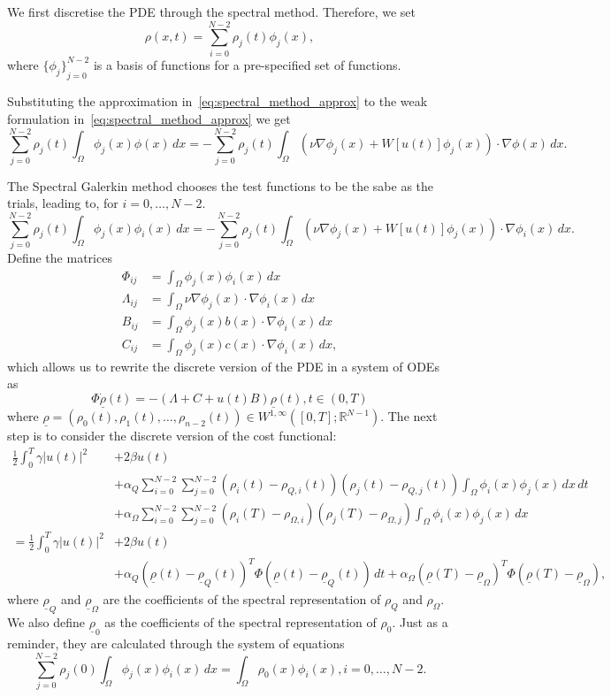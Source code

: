\documentclass[12pt]{article}
\newcommand{\R}{\mathbb{R}}
\newcommand{\rhovec}{\underline{\rho}}
\theoremstyle{definition}
\begin{document}
We first discretise the PDE through the spectral method. 
Therefore, we set
\begin{equation}
    \label{eq:spectral_method_approx}
    \rho(x,t) = \sum_{i=0}^{N-2} \rho_j(t) \phi_j(x),
\end{equation}
where ${\{\phi_j\}}_{j=0}^{N-2}$ is a basis of functions for a pre-specified set of functions.

Substituting the approximation in~\eqref{eq:spectral_method_approx} to the weak formulation in~\eqref{eq:spectral_method_approx} we get 
\[
\sum_{j=0}^{N-2} \rho_j(t) \int_{\Omega} \phi_j(x) \phi(x) \, dx = - \sum_{j=0}^{N-2} \rho_j(t)\int_{\Omega} (\nu \nabla \phi_j(x) + W[u(t)]\phi_j(x)) \cdot \nabla \phi(x) \, dx.
\]

The Spectral Galerkin method chooses the test functions to be the sabe as the trials, leading to, for $i=0,\dots,N-2$.
\[
\sum_{j=0}^{N-2} \rho_j(t) \int_{\Omega} \phi_j(x) \phi_i(x) \, dx = - \sum_{j=0}^{N-2} \rho_j(t)\int_{\Omega} (\nu \nabla \phi_j(x) + W[u(t)]\phi_j(x)) \cdot \nabla \phi_i(x) \, dx.
\]
Define the matrices 
\begin{align*}
    \Phi_{ij} &= \int_{\Omega} \phi_j(x) \phi_i(x) \, dx \\ 
    \Lambda_{ij} &= \int_{\Omega} \nu \nabla \phi_j(x) \cdot \nabla \phi_i(x) \, dx \\
    B_{ij} &= \int_{\Omega} \phi_j(x) b(x) \cdot \nabla \phi_i(x) \, dx \\
    C_{ij} &= \int_{\Omega} \phi_j(x) c(x) \cdot \nabla \phi_i(x) \, dx,
\end{align*}
which allows us to rewrite the discrete version of the PDE in a system of ODEs as
\[
\Phi \dot{\rhovec}(t) = -(\Lambda + C + u(t) B) \rhovec(t), t \in (0,T)    
\]
where $\rhovec = (\rho_0(t), \rho_1(t), \dots, \rho_{n-2}(t)) \in W^{1,\infty}([0,T]; \R^{N-1})$.
The next step is to consider the discrete version of the cost functional:
\[
\begin{split}
    \frac{1}{2} \int_0^T \gamma|u(t)|^2 &+ 2\beta u(t) \\
    &+ \alpha_Q \sum_{i=0}^{N-2} \sum_{j=0}^{N-2} (\rho_i(t) - \rho_{Q,i}(t))(\rho_j(t) - \rho_{Q,j}(t))\int_{\Omega} \phi_i(x) \phi_j(x) \, dx \, dt \\
    &+\alpha_{\Omega} \sum_{i=0}^{N-2} \sum_{j=0}^{N-2} (\rho_i(T) - \rho_{\Omega,i})(\rho_j(T) - \rho_{\Omega,j})\int_{\Omega} \phi_i(x) \phi_j(x) \, dx \\
    = \frac{1}{2} \int_0^T \gamma|u(t)|^2 &+ 2\beta u(t) \\
    &+ \alpha_Q {(\rhovec(t) - \rhovec_Q(t))}^T  \Phi {(\rhovec(t) - \rhovec_Q(t))} \, dt + \alpha_{\Omega} {(\rhovec(T) - \rhovec_{\Omega})}^T  \Phi {(\rhovec(T) - \rhovec_{\Omega})},
\end{split}
\]
where $\rhovec_Q$ and  $\rhovec_{\Omega}$ are the coefficients of the spectral representation of $\rho_{Q}$ and $\rho_{\Omega}$.
We also define $\rhovec_0$ as the coefficients of the spectral representation of $\rho_0$.
Just as a reminder, they are calculated through the system of equations
\[
\sum_{j=0}^{N-2} \rho_j(0) \int_{\Omega} \phi_j(x) \phi_i(x) \, dx = \int_{\Omega} \rho_0(x) \phi_i(x), i=0,\dots,N-2.    
\]
\end{document}
